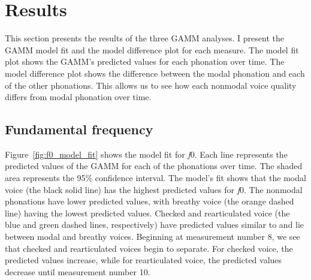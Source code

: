 \section{Results}\label{sec:results_of_lc}

This section presents the results of the three GAMM analyses. I present the GAMM model fit and the model difference plot for each measure. The model fit plot shows the GAMM's predicted values for each phonation over time. The model difference plot shows the difference between the modal phonation and each of the other phonations. This allows us to see how each nonmodal voice quality differs from modal phonation over time.
\subsection{Fundamental frequency} \label{sec:model_f0}

Figure~\ref{fig:f0_model_fit} shows the model fit for \textit{f}0. Each line represents the predicted values of the GAMM for each of the phonations over time. The shaded area represents the 95\% confidence interval. The model's fit shows that the modal voice (the black solid line) has the highest predicted values for \textit{f}0. The nonmodal phonations have lower predicted values, with breathy voice (the orange dashed line) having the lowest predicted values. Checked and rearticulated voice (the blue and green dashed lines, respectively) have predicted values similar to and lie between modal and breathy voices. Beginning at measurement number 8, we see that checked and rearticulated voices begin to separate. For checked voice, the predicted values increase, while for rearticulated voice, the predicted values decrease until measurement number 10.

